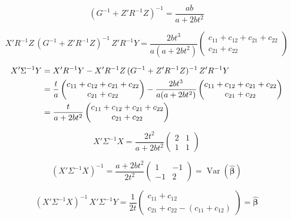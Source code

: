 \documentclass[11pt]{article}
\newcommand{\Var}{\operatorname{Var}}
\begin{document}
\begin{equation}
  (G^{-1} + Z'R^{-1}Z)^{-1}
  = \frac{ab}{a + 2bt^2}
\end{equation}

\begin{equation}
  X'R^{-1}Z\,(G^{-1} + Z'R^{-1}Z)^{-1}\,Z'R^{-1}Y
  = \frac{2bt^3}{a(a + 2bt^2)}
    \begin{pmatrix}
      c_{11} + c_{12} + c_{21} + c_{22} \\
      c_{21} + c_{22}
    \end{pmatrix}
\end{equation}

\begin{align}
  X'\Sigma^{-1}Y
  &= X'R^{-1}Y
    - X'R^{-1}Z\,(G^{-1}+Z'R^{-1}Z)^{-1}\,Z'R^{-1}Y
    \notag \\
  &= \frac{t}{a}
    \begin{pmatrix}
      c_{11}+c_{12}+c_{21}+c_{22} \\
      c_{21}+c_{22}
    \end{pmatrix}
    - \frac{2bt^3}{a(a+2bt^2)}
    \begin{pmatrix}
      c_{11}+c_{12}+c_{21}+c_{22} \\
      c_{21}+c_{22}
    \end{pmatrix}
    \notag \\
  &= \frac{t}{a+2bt^2}
    \begin{pmatrix}
      c_{11}+c_{12}+c_{21}+c_{22} \\
      c_{21}+c_{22}
    \end{pmatrix}
\end{align}

\begin{equation}
  X'\Sigma^{-1}X
  = \frac{2t^2}{a + 2bt^2}
    \begin{pmatrix} 2 & 1 \\ 1 & 1 \end{pmatrix}
\end{equation}

\begin{equation}
  \boxed{
  (X'\Sigma^{-1}X)^{-1}
  = \frac{a + 2bt^2}{2t^2}
    \begin{pmatrix} 1 & -1 \\ -1 & 2 \end{pmatrix}
  = \Var(\hat{\bm{\beta}})
  }
\end{equation}

\begin{equation}
  \boxed{
  (X'\Sigma^{-1}X)^{-1}\,X'\Sigma^{-1}Y
  = \frac{1}{2t}
    \begin{pmatrix}
      c_{11} + c_{12} \\
      c_{21} + c_{22} - (c_{11} + c_{12})
    \end{pmatrix}
  = \hat{\bm{\beta}}
  }
\end{equation}
\end{document}
